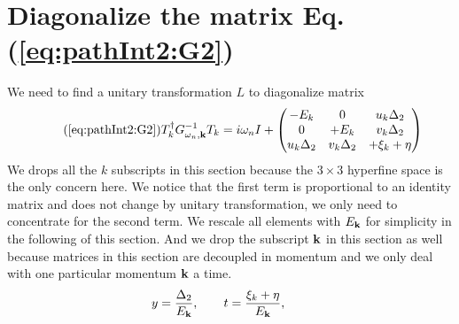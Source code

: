 

\section{Diagonalize the matrix Eq. (\ref{eq:pathInt2:G2})\label{sec:diagonalize}}
We need to find a unitary transformation $L$ to diagonalize matrix 
\begin{equation}\tag{\ref{eq:pathInt2:G2}}
T_k^{\dg}G_{\omega_{n},\vk}^{-1}T_k=i\omega_nI+\mtrx{-E_k&0&u_k\Delta_2\\0&+E_k&v_k\Delta_2\\u_k\Delta_2&v_k\Delta_2&+\xi_k+\eta}
\end{equation}
We drops all the $k$ subscripts in this section because the $3\times3$ hyperfine space is the only concern here.  We notice that the first term is proportional to an identity matrix and does not change by unitary transformation, we only need to concentrate for the second term.  We rescale all elements with $E_{\mathbf{k}}$ for simplicity in the following of this section.  And we drop the subscript $\mathbf{k}$ in this section as well because matrices in this section are decoupled in momentum and we only deal with one particular momentum $\mathbf{k}$ a time.
\begin{equation*}
y=\frac{\Delta_2}{E_{\mathbf{k}}},\qquad
 t=\frac{\xi_k+\eta}{E_{\mathbf{k}}},\qquad
\end{equation*}
 
